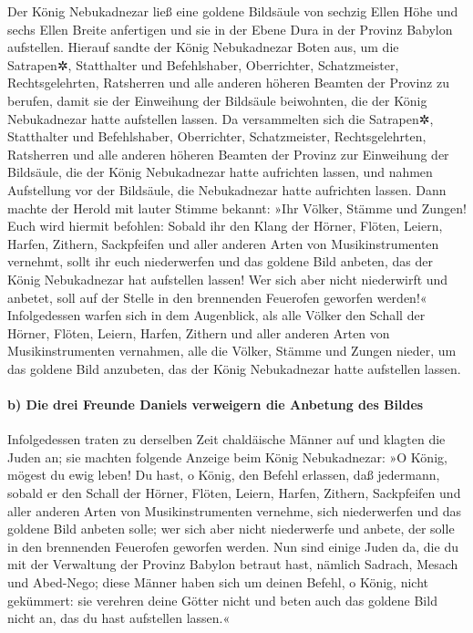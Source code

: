 Der König Nebukadnezar ließ eine goldene Bildsäule von
sechzig Ellen Höhe und sechs Ellen Breite anfertigen und sie in der
Ebene Dura in der Provinz Babylon aufstellen. Hierauf
sandte der König Nebukadnezar Boten aus, um die Satrapen✲, Statthalter
und Befehlshaber, Oberrichter, Schatzmeister, Rechtsgelehrten,
Ratsherren und alle anderen höheren Beamten der Provinz zu berufen,
damit sie der Einweihung der Bildsäule beiwohnten, die der König
Nebukadnezar hatte aufstellen lassen. Da versammelten sich
die Satrapen✲, Statthalter und Befehlshaber, Oberrichter, Schatzmeister,
Rechtsgelehrten, Ratsherren und alle anderen höheren Beamten der Provinz
zur Einweihung der Bildsäule, die der König Nebukadnezar hatte
aufrichten lassen, und nahmen Aufstellung vor der Bildsäule, die
Nebukadnezar hatte aufrichten lassen. Dann machte der
Herold mit lauter Stimme bekannt: »Ihr Völker, Stämme und Zungen! Euch
wird hiermit befohlen: Sobald ihr den Klang der Hörner,
Flöten, Leiern, Harfen, Zithern, Sackpfeifen und aller anderen Arten von
Musikinstrumenten vernehmt, sollt ihr euch niederwerfen und das goldene
Bild anbeten, das der König Nebukadnezar hat aufstellen lassen!
Wer sich aber nicht niederwirft und anbetet, soll auf der
Stelle in den brennenden Feuerofen geworfen werden!«
Infolgedessen warfen sich in dem Augenblick, als alle
Völker den Schall der Hörner, Flöten, Leiern, Harfen, Zithern und aller
anderen Arten von Musikinstrumenten vernahmen, alle die Völker, Stämme
und Zungen nieder, um das goldene Bild anzubeten, das der König
Nebukadnezar hatte aufstellen lassen.

\hypertarget{b-die-drei-freunde-daniels-verweigern-die-anbetung-des-bildes}{%
\paragraph{b) Die drei Freunde Daniels verweigern die Anbetung des
Bildes}\label{b-die-drei-freunde-daniels-verweigern-die-anbetung-des-bildes}}

Infolgedessen traten zu derselben Zeit chaldäische Männer
auf und klagten die Juden an; sie machten folgende Anzeige
beim König Nebukadnezar: »O König, mögest du ewig leben!
Du hast, o König, den Befehl erlassen, daß jedermann,
sobald er den Schall der Hörner, Flöten, Leiern, Harfen, Zithern,
Sackpfeifen und aller anderen Arten von Musikinstrumenten vernehme, sich
niederwerfen und das goldene Bild anbeten solle; wer sich
aber nicht niederwerfe und anbete, der solle in den brennenden Feuerofen
geworfen werden. Nun sind einige Juden da, die du mit der
Verwaltung der Provinz Babylon betraut hast, nämlich Sadrach, Mesach und
Abed-Nego; diese Männer haben sich um deinen Befehl, o König, nicht
gekümmert: sie verehren deine Götter nicht und beten auch das goldene
Bild nicht an, das du hast aufstellen lassen.«

